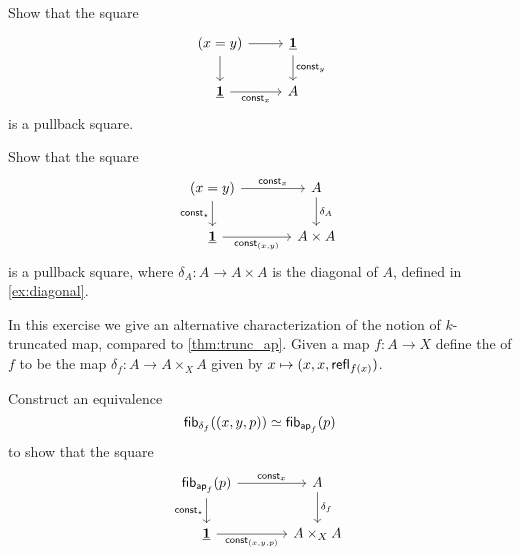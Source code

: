 \begin{exercises}
\item \label{ex:id_pb}
\begin{subexenum}
\item Show that the square
\begin{equation*}
\begin{tikzcd}
(x=y) \arrow[r] \arrow[d] & \unit \arrow[d,"\mathsf{const}_y"] \\
\unit \arrow[r,swap,"\mathsf{const}_x"] & A
\end{tikzcd}
\end{equation*}
is a pullback square.
\item Show that the square
\begin{equation*}
\begin{tikzcd}[column sep=large]
(x=y) \arrow[r,"\mathsf{const}_{x}"] \arrow[d,swap,"\mathsf{const}_\ttt"] & A \arrow[d,"\delta_A"] \\
\unit \arrow[r,swap,"{\mathsf{const}_{(x,y)}}"] & A\times A
\end{tikzcd}
\end{equation*}
is a pullback square, where $\delta_A:A\to A\times A$ is the diagonal of $A$, defined in \cref{ex:diagonal}.
\end{subexenum}
\item \label{ex:trunc_diagonal_map}In this exercise we give an alternative characterization of the notion of $k$-truncated map, compared to \cref{thm:trunc_ap}. Given a map $f:A\to X$ define the  of $f$ to be the map $\delta_f:A\to A\times_X A$ given by $x\mapsto (x,x,\mathsf{refl}_{f(x)})$.
\begin{subexenum}
\item Construct an equivalence
\begin{equation*}
\eqv{\fib{\delta_f}{(x,y,p)}}{\fib{\apfunc{f}}{p}}
\end{equation*}
to show that the square
\begin{equation*}
\begin{tikzcd}[column sep=large]
\fib{\apfunc{f}}{p} \arrow[r,"\mathsf{const}_x"] \arrow[d,swap,"\mathsf{const}_\ttt"] & A \arrow[d,"\delta_f"] \\
\unit \arrow[r,swap,"{\mathsf{const}_{(x,y,p)}}"] & A\times_X A
\end{tikzcd}
\end{equation*}

\end{subexenum}
\end{exercises}
